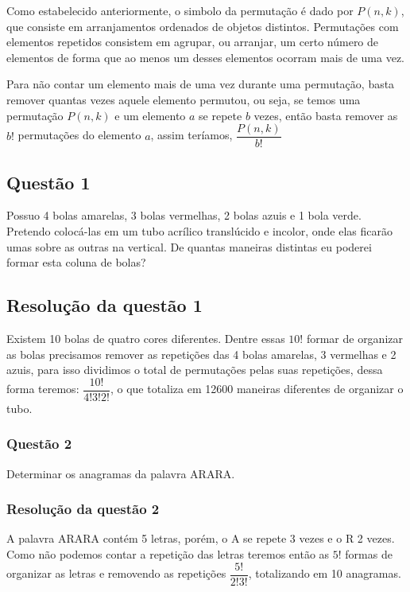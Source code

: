 Como estabelecido anteriormente, o simbolo da permutação é dado por $P(n,k)$, que consiste em arranjamentos ordenados de objetos distintos. Permutações com elementos repetidos consistem em agrupar, ou arranjar, um certo número de elementos de forma que ao menos um desses elementos ocorram mais de uma vez.

Para não contar um elemento mais de uma vez durante uma permutação, basta remover quantas vezes aquele elemento permutou, ou seja, se temos uma permutação $P(n,k)$ e um elemento $a$ se repete $b$ vezes, então basta remover as $b!$ permutações do elemento $a$, assim teríamos, $\dfrac{P(n,k)}{b!}$


\subsection*{Questão 1}
Possuo 4 bolas amarelas, 3 bolas vermelhas, 2 bolas azuis e 1 bola verde. Pretendo colocá-las em um tubo acrílico translúcido e incolor, onde elas ficarão umas sobre as outras na vertical. De quantas maneiras distintas eu poderei formar esta coluna de bolas?

\subsection*{Resolução da questão 1}

Existem 10 bolas de quatro cores diferentes. Dentre essas $10!$ formar de organizar as bolas precisamos remover as repetições das 4 bolas amarelas, 3 vermelhas e 2 azuis, para isso dividimos o total de permutações pelas suas repetições, dessa forma teremos: $\dfrac{10!}{4! 3! 2!}$, o que totaliza em 12600 maneiras diferentes de organizar o tubo.

\subsubsection*{Questão 2}

Determinar os anagramas da palavra ARARA. 

\subsubsection*{Resolução da questão 2}

A palavra ARARA contém 5 letras, porém, o A se repete 3 vezes e o R 2 vezes. Como não podemos contar a repetição das letras teremos então as $5!$ formas de organizar as letras e removendo as repetições $\dfrac{5!}{2! 3!}$, totalizando em 10 anagramas.

